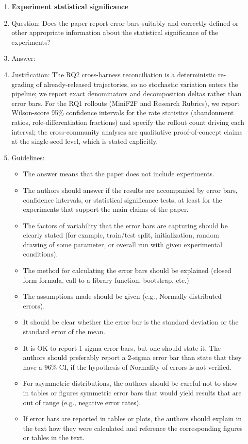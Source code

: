 \begin{enumerate}
\item {\bf Experiment statistical significance}
    \item[] Question: Does the paper report error bars suitably and correctly defined or other appropriate information about the statistical significance of the experiments?
    \item[] Answer: \answerYes{}
    \item[] Justification: The RQ2 cross-harness reconciliation is a deterministic re-grading of already-released trajectories, so no stochastic variation enters the pipeline; we report exact denominators and decomposition deltas rather than error bars. For the RQ1 rollouts (MiniF2F and Research Rubrics), we report Wilson-score 95\% confidence intervals for the rate statistics (abandonment ratios, role-differentiation fractions) and specify the rollout count driving each interval; the cross-community analyses are qualitative proof-of-concept claims at the single-seed level, which is stated explicitly.
    \item[] Guidelines:
    \begin{itemize}
        \item The answer \answerNA{} means that the paper does not include experiments.
        \item The authors should answer \answerYes{} if the results are accompanied by error bars, confidence intervals, or statistical significance tests, at least for the experiments that support the main claims of the paper.
        \item The factors of variability that the error bars are capturing should be clearly stated (for example, train/test split, initialization, random drawing of some parameter, or overall run with given experimental conditions).
        \item The method for calculating the error bars should be explained (closed form formula, call to a library function, bootstrap, etc.)
        \item The assumptions made should be given (e.g., Normally distributed errors).
        \item It should be clear whether the error bar is the standard deviation or the standard error of the mean.
        \item It is OK to report 1-sigma error bars, but one should state it. The authors should preferably report a 2-sigma error bar than state that they have a 96\% CI, if the hypothesis of Normality of errors is not verified.
        \item For asymmetric distributions, the authors should be careful not to show in tables or figures symmetric error bars that would yield results that are out of range (e.g., negative error rates).
        \item If error bars are reported in tables or plots, the authors should explain in the text how they were calculated and reference the corresponding figures or tables in the text.
    \end{itemize}


\end{enumerate}
